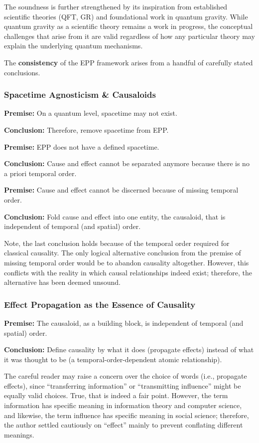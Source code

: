 The soundness is further strengthened by its inspiration from established scientific theories (QFT, GR) and foundational work in quantum gravity. While quantum gravity as a scientific theory remains a work in progress, the conceptual challenges that arise from it are valid regardless of how any particular theory may explain the underlying quantum mechanisms.

The \textbf{consistency} of the EPP framework arises from a handful of carefully stated conclusions.

\subsubsection{Spacetime Agnosticism \& Causaloids}

\textbf{Premise:} On a quantum level, spacetime may not exist.

\textbf{Conclusion:} Therefore, remove spacetime from EPP.

\textbf{Premise:} EPP does not have a defined spacetime.

\textbf{Conclusion:} Cause and effect cannot be separated anymore because there is no a priori temporal order.

\textbf{Premise:} Cause and effect cannot be discerned because of missing temporal order.

\textbf{Conclusion:} Fold cause and effect into one entity, the causaloid, that is independent of temporal (and spatial) order.

Note, the last conclusion holds because of the temporal order required for classical causality. The only logical alternative conclusion from the premise of missing temporal order would be to abandon causality altogether. However, this conflicts with the reality in which causal relationships indeed exist; therefore, the alternative has been deemed unsound.

\subsubsection{Effect Propagation as the Essence of Causality}

\textbf{Premise:} The causaloid, as a building block, is independent of temporal (and spatial) order.

\textbf{Conclusion:} Define causality by what it does (propagate effects) instead of what it was thought to be (a temporal-order-dependent atomic relationship).

The careful reader may raise a concern over the choice of words (i.e., propagate effects), since “transferring information” or “transmitting influence” might be equally valid choices. True, that is indeed a fair point. However, the term information has specific meaning in information theory and computer science, and likewise, the term influence has specific meaning in social science; therefore, the author settled cautiously on “effect” mainly to prevent conflating different meanings.

